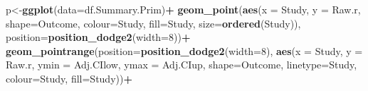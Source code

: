 \documentclass[
]{book}
\newenvironment{Shaded}{\begin{snugshade}}{\end{snugshade}}
\newcommand{\DataTypeTok}[1]{\textcolor[rgb]{0.13,0.29,0.53}{#1}}
\newcommand{\DecValTok}[1]{\textcolor[rgb]{0.00,0.00,0.81}{#1}}
\newcommand{\KeywordTok}[1]{\textcolor[rgb]{0.13,0.29,0.53}{\textbf{#1}}}
\newcommand{\NormalTok}[1]{#1}
\newcommand{\OperatorTok}[1]{\textcolor[rgb]{0.81,0.36,0.00}{\textbf{#1}}}
\newcommand{\StringTok}[1]{\textcolor[rgb]{0.31,0.60,0.02}{#1}}
\begin{document}
\begin{Shaded}
\begin{Highlighting}[]
\NormalTok{p<-}\KeywordTok{ggplot}\NormalTok{(}\DataTypeTok{data=}\NormalTok{df.Summary.Prim)}\OperatorTok{+}
\StringTok{  }\KeywordTok{geom_point}\NormalTok{(}\KeywordTok{aes}\NormalTok{(}\DataTypeTok{x =}\NormalTok{ Study, }\DataTypeTok{y =}\NormalTok{ Raw.r, }\DataTypeTok{shape=}\NormalTok{Outcome, }
                 \DataTypeTok{colour=}\NormalTok{Study, }\DataTypeTok{fill=}\NormalTok{Study, }\DataTypeTok{size=}\KeywordTok{ordered}\NormalTok{(Study)),}
             \DataTypeTok{position=}\KeywordTok{position_dodge2}\NormalTok{(}\DataTypeTok{width=}\DecValTok{8}\NormalTok{))}\OperatorTok{+}\StringTok{ }
\StringTok{  }
\StringTok{  }\KeywordTok{geom_pointrange}\NormalTok{(}\DataTypeTok{position=}\KeywordTok{position_dodge2}\NormalTok{(}\DataTypeTok{width=}\DecValTok{8}\NormalTok{), }
                  \KeywordTok{aes}\NormalTok{(}\DataTypeTok{x =}\NormalTok{ Study, }\DataTypeTok{y =}\NormalTok{ Raw.r, }
                      \DataTypeTok{ymin =}\NormalTok{ Adj.CIlow, }\DataTypeTok{ymax =}\NormalTok{ Adj.CIup,  }\DataTypeTok{shape=}\NormalTok{Outcome,}
                      \DataTypeTok{linetype=}\NormalTok{Study, }\DataTypeTok{colour=}\NormalTok{Study, }\DataTypeTok{fill=}\NormalTok{Study))}\OperatorTok{+}


\end{Highlighting}
\end{Shaded}
\end{document}
